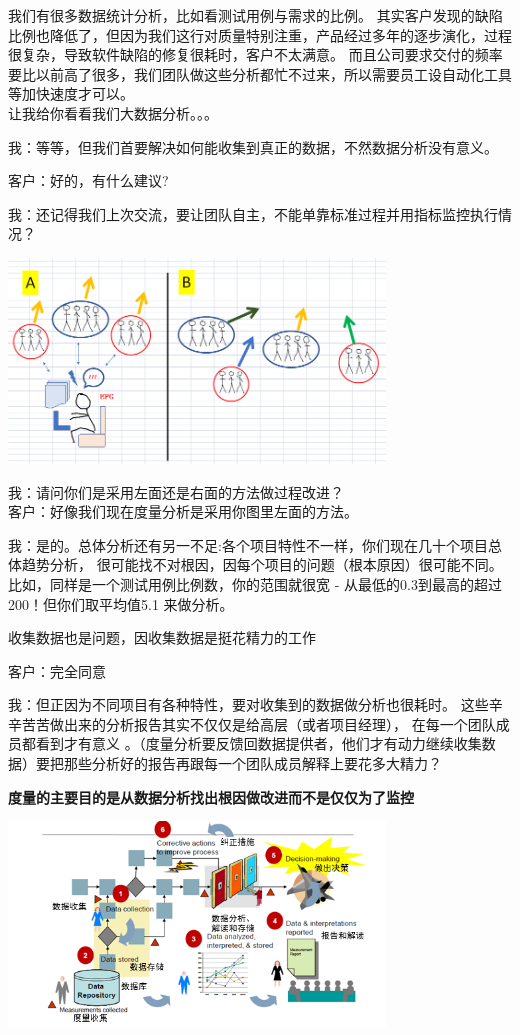 我们有很多数据统计分析，比如看测试用例与需求的比例。
其实客户发现的缺陷比例也降低了，但因为我们这行对质量特别注重，产品经过多年的逐步演化，过程很复杂，导致软件缺陷的修复很耗时，客户不太满意。
而且公司要求交付的频率要比以前高了很多，我们团队做这些分析都忙不过来，所以需要员工设自动化工具等加快速度才可以。\\
让我给你看看我们大数据分析。。。

我：等等，但我们首要解决如何能收集到真正的数据，不然数据分析没有意义。

客户：好的，有什么建议?

我：还记得我们上次交流，要让团队自主，不能单靠标准过程并用指标监控执行情况？


\includegraphics[width=10cm]{Diagram20.png}

我：请问你们是采用左面还是右面的方法做过程改进？\\
客户：好像我们现在度量分析是采用你图里左面的方法。

我：是的。总体分析还有另一不足:各个项目特性不一样，你们现在几十个项目总体趋势分析，
很可能找不对根因，因每个项目的问题（根本原因）很可能不同。
比如，同样是一个测试用例比例数，你的范围就很宽 -
从最低的0.3到最高的超过200！但你们取平均值5.1 来做分析。

收集数据也是问题，因收集数据是挺花精力的工作

客户：完全同意

我：但正因为不同项目有各种特性，要对收集到的数据做分析也很耗时。
这些辛辛苦苦做出来的分析报告其实不仅仅是给高层（或者项目经理），
在每一个团队成员都看到才有意义
。（度量分析要反馈回数据提供者，他们才有动力继续收集数据）要把那些分析好的报告再跟每一个团队成员解释上要花多大精力？

\textbf{度量的主要目的是从数据分析找出根因做改进而不是仅仅为了监控}


\includegraphics[width=10cm]{Ma4CarScreenshot20211227205004.png}

